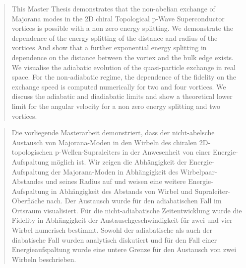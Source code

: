 \documentclass[Master]{subfiles}
\begin{document}
\begin{abstract}
This Master Thesis demonstrates that the non-abelian exchange of Majorana modes in the 2D chiral Topological p-Wave Superconductor vortices is possible with a non zero energy splitting.
We demonstrate the dependence of the energy splitting of the distance and radius of the vortices And show that a further exponential energy splitting in dependence on the distance between the vortex and the bulk edge exists. We visualise the adiabatic evolution of the quasi-particle exchange in real space. For the non-adiabatic regime, the dependence of the fidelity on the exchange speed is computed numerically for two and four vortices.  We discuss the adiabatic and diadiabatic limits and show a theoretical lower limit for the angular velocity for a non zero energy splitting and two vortices. 
\end{abstract}
\vspace{3cm}
\begin{abstract}
Die vorliegende Masterarbeit demonstriert, dass der nicht-abelsche Austausch von Majorana-Moden in den Wirbeln des chiralen 2D-topologischen p-Wellen-Supraleiters in der Anwesenheit von einer Energie-Aufspaltung möglich ist.
Wir zeigen die Abhängigkeit der Energie-Aufspaltung der Majorana-Moden in Abhängigkeit des Wirbelpaar-Abstandes und seines Radius auf und weisen eine weitere Energie-Aufspaltung in Abhängigkeit des Abstands von Wirbel und Supraleiter-Oberfläche nach. Der Austausch wurde für den adiabatischen Fall im Ortsraum  visualisiert.
Für die nicht-adiabatische Zeitentwicklung wurde die Fidelity in Abhängigkeit der Austauschgeschwindigkeit für zwei und vier Wirbel numerisch bestimmt.
Sowohl der adiabatische als auch der diabatische Fall wurden analytisch diskutiert und für den Fall einer Energieaufspaltung wurde eine untere Grenze für den Austausch von zwei Wirbeln beschrieben.
\end{abstract}
\pagebreak
\end{document}
